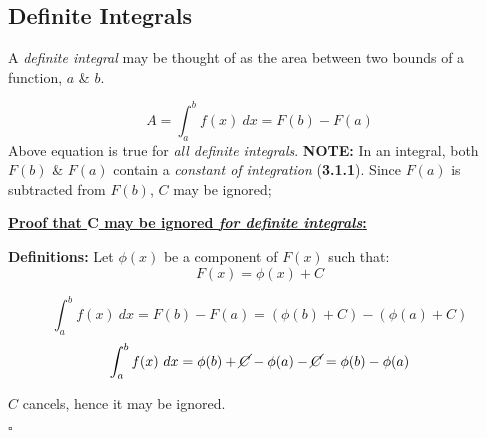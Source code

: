 \documentclass[12pt]{article}
\begin{document}
\subsection{Definite Integrals}

A \emph{definite integral} may be thought of as the area between two bounds of a function, $a$ \& $b$.
\begin{center}
\end{center}
\bigbreak

\begin{equation}
A = \int^{b}_{a}f(x)\ dx = F(b) - F(a)
\end{equation}
Above equation is true for \emph{all definite integrals}.
\bigbreak
	\textbf{NOTE:} \bigbreak
	In an integral, both $F(b)$ \& $F(a)$ contain a \emph{constant of integration} (\textbf{3.1.1}). Since $F(a)$ is subtracted from $F(b)$, $C$ may be ignored;

	\begin{BOX}

		\textbf{\underline{Proof that  $\bm C$ may be ignored \emph{for definite integrals}:}} \bigbreak

		\textbf{Definitions:} Let $\phi(x)$ be a component of $F(x)$ such that: $$F(x) = \phi(x) + C$$ \bigbreak

		$$\int^{b}_{a} f(x) \ dx = F(b) - F(a) = \left(\phi(b) + C\right) - \left(\phi(a) + C\right)$$
		$$\int^{b}_{a} f(x) \ dx = \phi(b) + \cancel{C} -\phi(a) - \cancel{C} = \phi(b)-\phi(a)$$
		\begin{center}
		$C$ cancels, hence it may be ignored.
		\end{center}	
		\begin{flushright}
			$\square$
		\end{flushright}
	\end{BOX}
\end{document}
